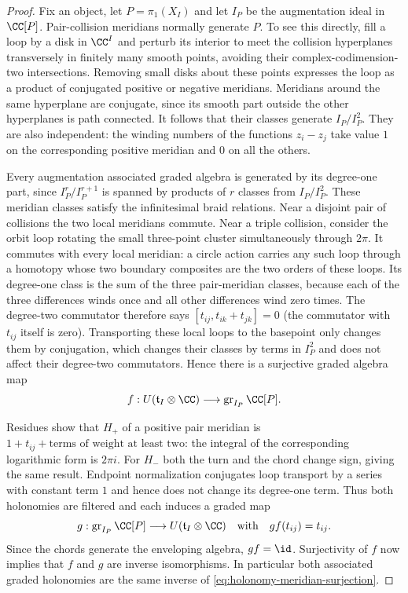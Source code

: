 \begin{proof}
Fix an object, let $P=\pi_1(X_I)$ and let $I_P$ be the augmentation
ideal in $\CC[P]$.  Pair-collision meridians normally generate $P$.
To see this directly, fill a loop by a disk in $\CC^I$ and perturb its
interior to meet the collision hyperplanes transversely in finitely
many smooth points, avoiding their complex-codimension-two
intersections.  Removing small disks about these points expresses the
loop as a product of conjugated positive or negative meridians.
Meridians around the same hyperplane are conjugate, since its smooth
part outside the other hyperplanes is path connected.  It follows
that their classes generate $I_P/I_P^2$.  They are also independent:
the winding numbers of the functions $z_i-z_j$ take value $1$ on the
corresponding positive meridian and $0$ on all the others.

Every augmentation associated graded algebra is generated by its
degree-one part, since $I_P^r/I_P^{r+1}$ is spanned by products of $r$
classes from $I_P/I_P^2$.  These meridian classes satisfy the
infinitesimal braid relations.  Near a disjoint pair of collisions
the two local meridians commute.  Near a triple collision, consider
the orbit loop rotating the small three-point cluster simultaneously
through $2\pi$.  It commutes with every local meridian: a circle
action carries any such loop through a homotopy whose two boundary
composites are the two orders of these loops.  Its degree-one class
is the sum of the three pair-meridian classes, because each of the
three differences winds once and all other differences wind zero
times.  The degree-two commutator therefore says
$[t_{ij},t_{ik}+t_{jk}]=0$ (the commutator with $t_{ij}$ itself is
zero).  Transporting these local loops to the basepoint only changes
them by conjugation, which changes their classes by terms in $I_P^2$
and does not affect their degree-two commutators.  Hence there is a
surjective graded algebra map
\begin{equation}\label{eq:holonomy-meridian-surjection}
 f:U(\mathfrak t_I\otimes\CC)
 \longrightarrow\operatorname{gr}_{I_P}\CC[P].
\end{equation}

Residues show that $H_+$ of a positive pair meridian is
$1+t_{ij}+\text{terms of weight at least two}$: the integral of the
corresponding logarithmic form is $2\pi i$.  For $H_-$ both the turn
and the chord change sign, giving the same result.  Endpoint
normalization conjugates loop transport by a series with constant
term $1$ and hence does not change its degree-one term.  Thus both
holonomies are filtered and each induces a graded map
\[
 g:\operatorname{gr}_{I_P}\CC[P]
 \longrightarrow U(\mathfrak t_I\otimes\CC)
 \quad\text{with}\quad g f(t_{ij})=t_{ij}.
\]
Since the chords generate the enveloping algebra, $gf=\id$.
Surjectivity of $f$ now implies that $f$ and $g$ are inverse
isomorphisms.  In particular both associated graded holonomies are
the same inverse of \eqref{eq:holonomy-meridian-surjection}.


\end{proof}
